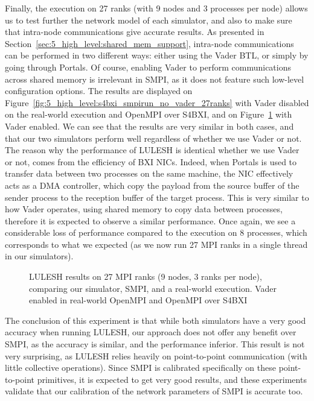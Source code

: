 Finally, the execution on 27 ranks (with 9 nodes and 3 processes per node)
allows us to test further the network model of each simulator, and also to make
sure that intra-node communications give accurate results. As presented in
Section~\ref{sec:5_high_level:shared_mem_support}, intra-node communications can
be performed in two different ways: either using the Vader BTL, or simply by
going through Portals. Of course, enabling Vader to perform communications
across shared memory is irrelevant in SMPI, as it does not feature such
low-level configuration options. The results are displayed on
Figure~\ref{fig:5_high_level:s4bxi_smpirun_no_vader_27ranks} with Vader disabled
on the real-world execution and OpenMPI over S4BXI, and on
Figure~\ref{fig:5_high_level:s4bxi_smpirun_vader_emulated_27ranks} with Vader
enabled. We can see that the results are very similar in both cases, and that
our two simulators perform well regardless of whether we use Vader or not. The
reason why the performance of LULESH is identical whether we use Vader or not,
comes from the efficiency of BXI NICs. Indeed, when Portals is used to transfer
data between two processes on the same machine, the NIC effectively acts as a
DMA controller, which copy the payload from the source buffer of the sender
process to the reception buffer of the target process. This is very similar to
how Vader operates, using shared memory to copy data between processes,
therefore it is expected to observe a similar performance. Once again, we see a
considerable loss of performance compared to the execution on 8 processes, which
corresponds to what we expected (as we now run 27 MPI ranks in a single thread
in our simulators).

\begin{figure}[!ht]
    \centering
    \caption{LULESH results on 27 MPI ranks (9 nodes, 3 ranks per node), comparing our simulator, SMPI, and a real-world execution. Vader enabled in real-world OpenMPI and OpenMPI over S4BXI}
    \label{fig:5_high_level:s4bxi_smpirun_vader_emulated_27ranks}
\end{figure}

The conclusion of this experiment is that while both simulators have a very good
accuracy when running LULESH, our approach does not offer any benefit over SMPI,
as the accuracy is similar, and the performance inferior. This result is not
very surprising, as LULESH relies heavily on point-to-point communication (with
little collective operations). Since SMPI is calibrated specifically on these
point-to-point primitives, it is expected to get very good results, and these
experiments validate that our calibration of the network parameters of SMPI is
accurate too.

